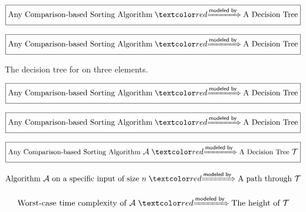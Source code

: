 \begin{frame}{}
  \[
    \boxed{\text{Any Comparison-based Sorting Algorithm} \;\red{\xRightarrow{ \textsf{modeled by} }}\; \text{A Decision Tree}}
  \]

  \pause
\end{frame}

\begin{frame}{}
  \[
    \boxed{\text{Any Comparison-based Sorting Algorithm} \;\red{\xRightarrow{ \textsf{modeled by} }}\; \text{A Decision Tree}}
  \]

  \centerline{The decision tree for  on three elements.}
\end{frame}

\begin{frame}{}
  \[
    \boxed{\text{Any Comparison-based Sorting Algorithm} \;\red{\xRightarrow{ \textsf{modeled by} }}\; \text{A Decision Tree}}
  \]

  
\end{frame}

\begin{frame}{}
  \[
    \boxed{\text{Any Comparison-based Sorting Algorithm} \;\red{\xRightarrow{ \textsf{modeled by} }}\; \text{A Decision Tree}}
  \]

\end{frame}

\begin{frame}{}
  \[
    \boxed{\text{\small Any Comparison-based Sorting Algorithm } \mathcal{A} \;\red{\xRightarrow{\textsf{modeled by}}}\; \text{\small A Decision Tree } \mathcal{T}}
  \]

  \pause
  \[
    \text{Algorithm $\mathcal{A}$ on a specific input of size } n \;\red{\xRightarrow{\textsf{modeled by}}}\; \text{A path through } \mathcal{T}
  \]

  \pause
  \[
    \text{Worst-case time complexity of $\mathcal{A}$} \;\red{\xRightarrow{\textsf{modeled by}}}\; \text{The height of } \mathcal{T}
  \]

  \pause
  \vspace{0.50cm}
  \centering
\end{frame}

